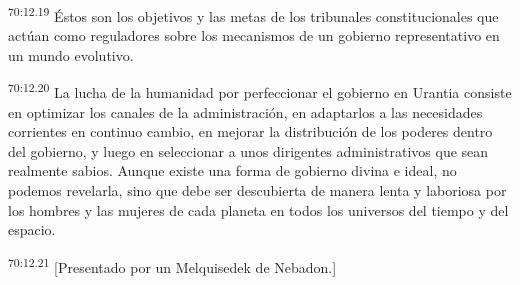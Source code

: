 \par
\textsuperscript{70:12.19} Éstos son los objetivos y las metas de los tribunales constitucionales que actúan como reguladores sobre los mecanismos de un gobierno representativo en un mundo evolutivo.

\par
\textsuperscript{70:12.20} La lucha de la humanidad por perfeccionar el gobierno en Urantia consiste en optimizar los canales de la administración, en adaptarlos a las necesidades corrientes en continuo cambio, en mejorar la distribución de los poderes dentro del gobierno, y luego en seleccionar a unos dirigentes administrativos que sean realmente sabios. Aunque existe una forma de gobierno divina e ideal, no podemos revelarla, sino que debe ser descubierta de manera lenta y laboriosa por los hombres y las mujeres de cada planeta en todos los universos del tiempo y del espacio.

\par
\textsuperscript{70:12.21} [Presentado por un Melquisedek de Nebadon.]